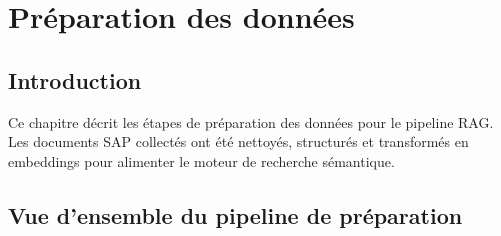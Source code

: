 
\chapter{Préparation des données}
\label{chap:preparation_donnees}

\section*{Introduction}

Ce chapitre décrit les étapes de préparation des données pour le pipeline RAG. Les documents SAP collectés ont été nettoyés, structurés et transformés en embeddings pour alimenter le moteur de recherche sémantique.
\section{Vue d'ensemble du pipeline de préparation}
\label{sec:vue-ensemble}

